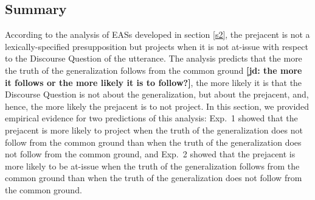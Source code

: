 \documentclass[11pt,fleqn]{article}
\newcommand{\6}{\mbox{$[\hspace*{-.6mm}[$}}
\newcommand{\9}{\mbox{$]\hspace*{-.6mm}]$}}
\newcommand{\jd}[1]{\textbf{\color{red}[jd: #1]}}
\begin{document}
\subsection{Summary}


According to the analysis of EASs developed in section \ref{s2}, the prejacent is not a lexically-specified presupposition but projects when it is not at-issue with respect to the Discourse Question of the utterance. The analysis predicts that the more the truth of the generalization follows from the common ground \jd{the more it follows or the more likely it is to follow?}, the more likely it is that the Discourse Question is not about the generalization, but about the prejacent, and, hence, the more likely the prejacent is to not project. In this section, we provided empirical evidence for two predictions of this analysis:  Exp.~1 showed that the prejacent is more likely to project when the truth of the generalization does not follow from the common ground than when the truth of the generalization does not follow from the common ground, and Exp.~2 showed that the prejacent is more likely to be at-issue when the truth of the generalization follows from the common ground than when the truth of the generalization does not follow from the common ground.
\end{document}
